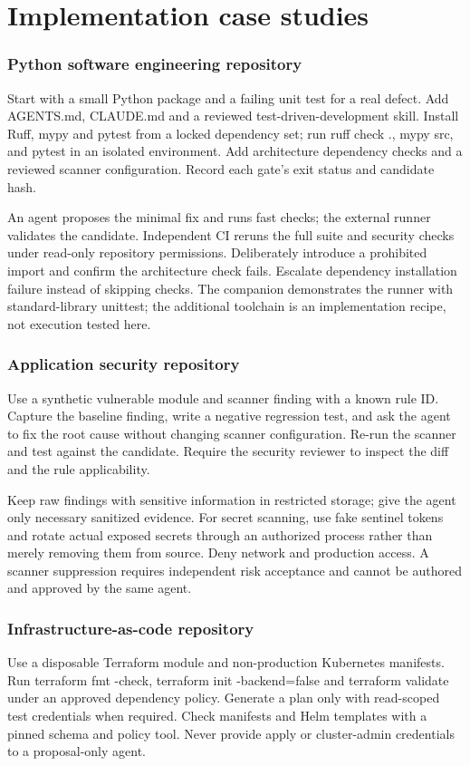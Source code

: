 \documentclass[11pt,letterpaper]{article}
\begin{document}
\clearpage\part{Implementation case studies}
\section{Python software engineering repository}
Start with a small Python package and a failing unit test for a real defect. Add AGENTS.md, CLAUDE.md and a reviewed test-driven-development skill. Install Ruff, mypy and pytest from a locked dependency set; run ruff check ., mypy src, and pytest in an isolated environment. Add architecture dependency checks and a reviewed scanner configuration. Record each gate's exit status and candidate hash.

An agent proposes the minimal fix and runs fast checks; the external runner validates the candidate. Independent CI reruns the full suite and security checks under read-only repository permissions. Deliberately introduce a prohibited import and confirm the architecture check fails. Escalate dependency installation failure instead of skipping checks. The companion demonstrates the runner with standard-library unittest; the additional toolchain is an implementation recipe, not execution tested here.

\section{Application security repository}
Use a synthetic vulnerable module and scanner finding with a known rule ID. Capture the baseline finding, write a negative regression test, and ask the agent to fix the root cause without changing scanner configuration. Re-run the scanner and test against the candidate. Require the security reviewer to inspect the diff and the rule applicability.

Keep raw findings with sensitive information in restricted storage; give the agent only necessary sanitized evidence. For secret scanning, use fake sentinel tokens and rotate actual exposed secrets through an authorized process rather than merely removing them from source. Deny network and production access. A scanner suppression requires independent risk acceptance and cannot be authored and approved by the same agent.

\section{Infrastructure-as-code repository}
Use a disposable Terraform module and non-production Kubernetes manifests. Run terraform fmt -check, terraform init -backend=false and terraform validate under an approved dependency policy. Generate a plan only with read-scoped test credentials when required. Check manifests and Helm templates with a pinned schema and policy tool. Never provide apply or cluster-admin credentials to a proposal-only agent.
\end{document}
